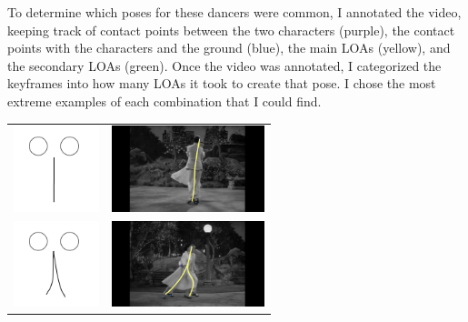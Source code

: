 To determine which poses for these dancers were common, I annotated the video, keeping track of contact points between the two characters (purple), the contact points with the characters and the ground (blue), the main LOAs (yellow), and the secondary LOAs (green). Once the video was annotated, I categorized the keyframes into how many LOAs it took to create that pose. I chose the most extreme examples of each combination that I could find.
\newpage

\begin{table}[h!]
\centering
\begin{tabular}{ll}
	\begin{minipage}{.28\textwidth}
      \includegraphics[width=\linewidth, height=25mm]{img/01keyframe}
    \end{minipage} &  
    \begin{minipage}{.28\textwidth}
      \includegraphics[width=\linewidth, height=25mm]{img/keyframe_case_1_(1)}
    \end{minipage}\\
	\begin{minipage}{.28\textwidth}
      \includegraphics[width=\linewidth, height=25mm]{img/02keyframe}
    \end{minipage} & 
        \begin{minipage}{.28\textwidth}
      \includegraphics[width=\linewidth, height=25mm]{img/keyframe_case_2_(2)}

\end{minipage}
\end{tabular}
\end{table}
